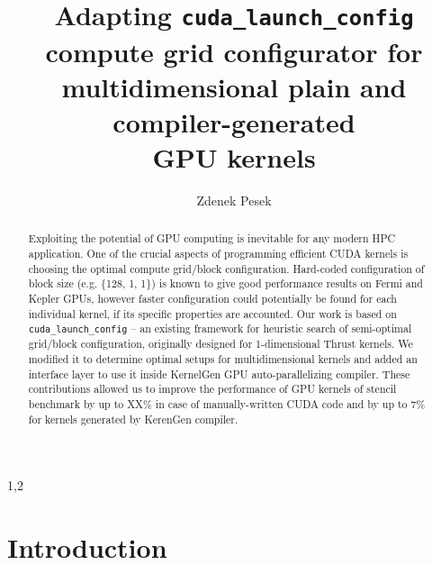 \documentclass{usiinftr}
\begin{document}
\title{Adapting \texttt{cuda\_launch\_config} compute grid configurator for multidimensional plain and compiler-generated\\ GPU kernels}

\author{Zdenek Pesek}{1,2}


%
%

%
%

\maketitle

\begin{abstract}

Exploiting the potential of GPU computing is inevitable for any modern HPC application. One of the crucial aspects of programming efficient CUDA kernels is choosing the optimal compute grid/block configuration. Hard-coded configuration of block size (e.g. \{128, 1, 1\}) is known to give good performance results on Fermi and Kepler GPUs, however faster configuration could potentially be found for each individual kernel, if its specific properties are accounted.
\vskip4pt
Our work is based on \texttt{cuda\_launch\_config} -- an existing framework for heuristic search of semi-optimal grid/block configuration, originally designed for 1-dimensional Thrust kernels. We modified it to determine optimal setups for multidimensional kernels and added an interface layer to use it inside KernelGen GPU auto-parallelizing compiler. These contributions allowed us to improve the performance of GPU kernels of stencil benchmark by up to XX\% in case of manually-written CUDA code and by up to 7\% for kernels generated by KerenGen compiler.

\end{abstract}

\section{Introduction}
\end{document}

